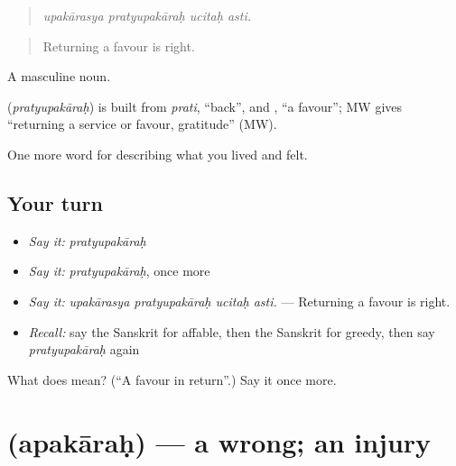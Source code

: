 \begin{quote}
\emph{upakārasya pratyupakāraḥ ucitaḥ asti.}
\end{quote}

\begin{quote}
Returning a favour is right.
\end{quote}

A masculine noun.

\begin{cousinweb}
\textbf{} (\emph{pratyupakāraḥ}) is built from \emph{prati}, \textquotedblleft{}back\textquotedblright{}, and \textbf{}, \textquotedblleft{}a favour\textquotedblright{}; MW gives \textquotedblleft{}returning a service or favour, gratitude\textquotedblright{} (MW).
\end{cousinweb}

\begin{grammarlens}[title={What you've built}]
One more word for describing what you lived and felt.
\end{grammarlens}

\subsection*{Your turn}
\begin{itemize}
\raggedright
  \item \emph{Say it:} \emph{pratyupakāraḥ}
  \item \emph{Say it:} \emph{pratyupakāraḥ}, once more
  \item \emph{Say it:} \emph{upakārasya pratyupakāraḥ ucitaḥ asti.} — Returning a favour is right.
  \item \emph{Recall:} say the Sanskrit for affable, then the Sanskrit for greedy, then say \emph{pratyupakāraḥ} again
\end{itemize}

\begin{tcolorbox}[breakable,colback=teal!4,colframe=teal!35!black,title={Before you move on}]
What does  mean? (\textquotedblleft{}A favour in return\textquotedblright{}.) Say it once more.
\end{tcolorbox}
\section[\texorpdfstring{\sk{अपकारः} (apakāraḥ)}{अपकारः (apakāraḥ)}]{ (apakāraḥ) — a wrong; an injury}

\label{lesson:SA-C468-apakarah}



